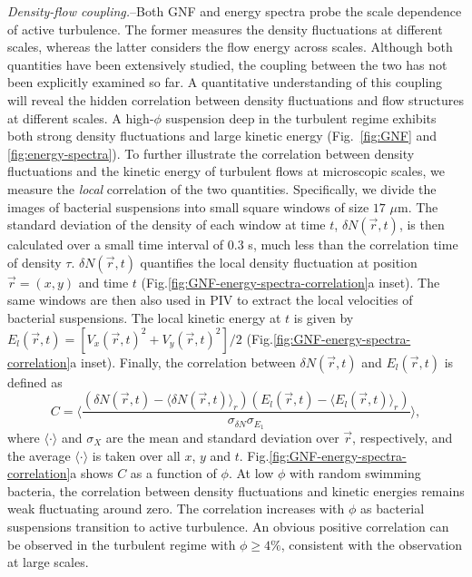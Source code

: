 \documentclass[twocolumn,aps,prl,amsmath,amssymb,longbibliography]{revtex4-2}
\begin{document}
\textit{Density-flow coupling.}--Both GNF and energy spectra probe the scale dependence of active turbulence. The former measures the density fluctuations at different scales, whereas the latter considers the flow energy across scales. Although both quantities have been extensively studied, the coupling between the two has not been explicitly examined so far. A quantitative understanding of this coupling will reveal the hidden correlation between density fluctuations and flow structures at different scales.
A high-$\phi$ suspension deep in the turbulent regime exhibits both strong density fluctuations and large kinetic energy (Fig.~\ref{fig:GNF} and \ref{fig:energy-spectra}). To further illustrate the correlation between density fluctuations and the kinetic energy of turbulent flows at microscopic scales, we measure the \emph{local} correlation of the two quantities. Specifically, we divide the images of bacterial suspensions into small square windows of size $17$ $\mu$m. The standard deviation of the density of each window at time $t$, $\delta N(\vec{r},t)$, is then calculated over a small time interval of $0.3$ s, much less than the correlation time of density $\tau$.
$\delta N(\vec{r},t)$ quantifies the local density fluctuation at position $\vec{r} = (x,y)$ and time $t$ (Fig.\ref{fig:GNF-energy-spectra-correlation}a inset).
The same windows are then also used in PIV to extract the local velocities of bacterial suspensions. The local kinetic energy at $t$ is given by $E_l(\vec{r},t) = \left[ V_x(\vec{r},t)^2 + V_y(\vec{r},t)^2 \right]/2$ (Fig.\ref{fig:GNF-energy-spectra-correlation}a inset). Finally, the correlation between $\delta N(\vec{r},t)$ and $E_l(\vec{r},t)$ is defined as
\begin{equation}
C = \bigg \langle \frac{ (\delta N(\vec{r},t) - \langle \delta N(\vec{r},t) \rangle_r)(E_l(\vec{r},t) - \langle E_l(\vec{r},t) \rangle_r)}{\sigma_{\delta N}\sigma_{E_1}} \bigg \rangle,
\end{equation}
where $\langle\cdot\rangle$ and $\sigma_X$ are the mean and standard deviation over $\vec{r}$, respectively, and the average $\langle\cdot\rangle$ is taken over all $x$, $y$ and $t$.
Fig.\ref{fig:GNF-energy-spectra-correlation}a shows $C$ as a function of $\phi$. At low $\phi$ with random swimming bacteria, the correlation between density fluctuations and kinetic energies remains weak fluctuating around zero. The correlation increases with $\phi$ as bacterial suspensions transition to active turbulence. An obvious positive correlation can be observed in the turbulent regime with $\phi \ge 4\%$, consistent with the observation at large scales.
\end{document}
